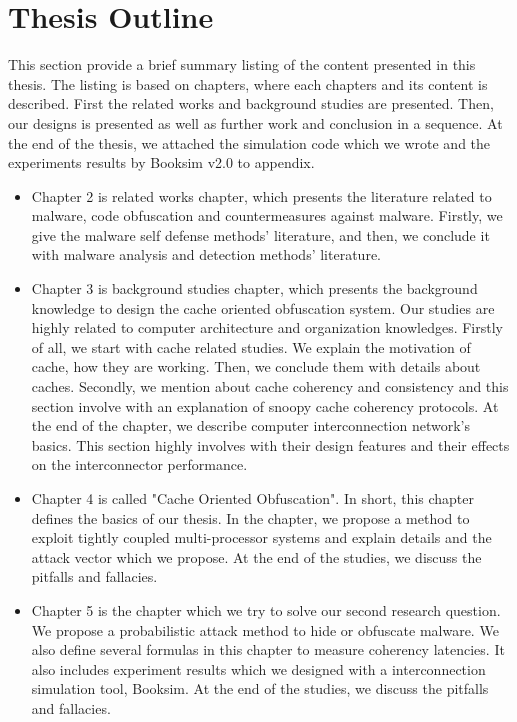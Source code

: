 \section{Thesis Outline}
	This section provide a brief summary listing of the content presented in this thesis. The listing is based on chapters, where each chapters and its content is described. First the related works and background studies are presented. Then, our designs is presented as well as further work and conclusion in a sequence. At the end of the thesis, we attached the simulation code which we wrote and the experiments results by Booksim v2.0 to appendix.
	
\begin{itemize}
	\item Chapter 2 is related works chapter, which presents the literature related to malware, code obfuscation and countermeasures against malware. Firstly, we give the malware self defense methods' literature, and then, we conclude it with malware analysis and detection methods' literature.
	\item Chapter 3 is background studies chapter, which presents the background knowledge to design the cache oriented obfuscation system. Our studies are highly related to computer architecture and organization knowledges. Firstly of all, we start with cache related studies. We explain the motivation of cache, how they are working. Then, we conclude them with details about caches. Secondly, we mention about cache coherency and consistency and this section involve with an explanation of snoopy cache coherency protocols. At the end of the chapter, we describe computer interconnection network's basics. This section highly involves with their design features and their effects on the interconnector performance.
	\item Chapter 4 is called "Cache Oriented Obfuscation". In short, this chapter defines the basics of our thesis. In the chapter, we propose a method to exploit tightly coupled multi-processor systems and explain details and the attack vector which we propose. At the end of the studies, we discuss the pitfalls and fallacies.
	\item Chapter 5 is the chapter which we try to solve our second research question. We propose a probabilistic attack method to hide or obfuscate malware. We also define several formulas in this chapter to measure coherency latencies. It also includes experiment results which we designed with a interconnection simulation tool, Booksim. At the end of the studies, we discuss the pitfalls and fallacies.

\end{itemize}
